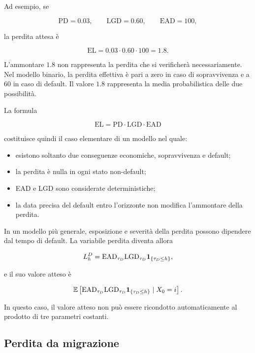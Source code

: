 Ad esempio, se

\[
\mathrm{PD}=0.03,
\qquad
\mathrm{LGD}=0.60,
\qquad
\mathrm{EAD}=100,
\]

la perdita attesa \`{e}

\[
\mathrm{EL}
=
0.03\cdot 0.60\cdot 100
=
1.8.
\]

L'ammontare $1.8$ non rappresenta la perdita che si verificher\`{a}
necessariamente. Nel modello binario, la perdita effettiva \`{e} pari
a zero in caso di sopravvivenza e a $60$ in caso di default. Il
valore $1.8$ rappresenta la media probabilistica delle due
possibilit\`{a}.

La formula

\[
\mathrm{EL}
=
\mathrm{PD}
\cdot
\mathrm{LGD}
\cdot
\mathrm{EAD}
\]

costituisce quindi il caso elementare di un modello nel quale:

\begin{itemize}

\item esistono soltanto due conseguenze economiche, sopravvivenza e
default;

\item la perdita \`{e} nulla in ogni stato non-default;

\item EAD e LGD sono considerate deterministiche;

\item la data precisa del default entro l'orizzonte non modifica
l'ammontare della perdita.

\end{itemize}

In un modello pi\`{u} generale, esposizione e severit\`{a} della
perdita possono dipendere dal tempo di default. La variabile perdita
diventa allora

\[
L_h^{D}
=
\mathrm{EAD}_{\tau_D}
\mathrm{LGD}_{\tau_D}
\mathbf{1}_{\{\tau_D\leq h\}},
\]

e il suo valore atteso \`{e}

\[
\mathbb{E}
\left[
\mathrm{EAD}_{\tau_D}
\mathrm{LGD}_{\tau_D}
\mathbf{1}_{\{\tau_D\leq h\}}
\mid X_0=i
\right].
\]

In questo caso, il valore atteso non pu\`{o} essere ricondotto
automaticamente al prodotto di tre parametri costanti.

\subsection{Perdita da migrazione}

